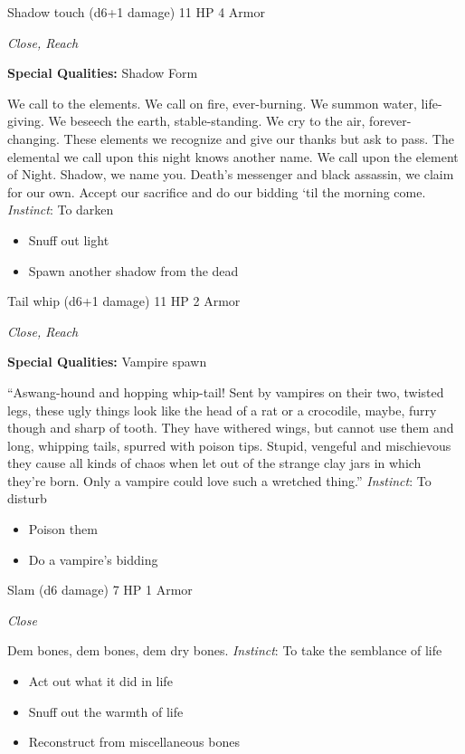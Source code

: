 \HRule
{}

Shadow touch (d6+1 damage)\hspace*{\fill} 11 HP 4 Armor

\emph{Close, Reach}

\textbf{Special Qualities:}
Shadow Form

\HRule
We call to the elements. We call on fire, ever-burning. We summon water, life-giving. We beseech the earth, stable-standing. We cry to the air, forever-changing. These elements we recognize and give our thanks but ask to pass. The elemental we call upon this night knows another name. We call upon the element of Night. Shadow, we name you. Death's messenger and black assassin, we claim for our own. Accept our sacrifice and do our bidding `til the morning come. \emph{Instinct}: To darken
\begin{itemize}
\item Snuff out light
\item Spawn another shadow from the dead
\end{itemize}
\newpage
\HRule
{}

Tail whip (d6+1 damage)\hspace*{\fill} 11 HP 2 Armor

\emph{Close, Reach}

\textbf{Special Qualities:}
Vampire spawn

\HRule
``Aswang-hound and hopping whip-tail! Sent by vampires on their two, twisted legs, these ugly things look like the head of a rat or a crocodile, maybe, furry though and sharp of tooth. They have withered wings, but cannot use them and long, whipping tails, spurred with poison tips. Stupid, vengeful and mischievous they cause all kinds of chaos when let out of the strange clay jars in which they're born. Only a vampire could love such a wretched thing.'' \emph{Instinct}: To disturb
\begin{itemize}
\item Poison them
\item Do a vampire's bidding
\end{itemize}

\HRule
{}

Slam (d6 damage)\hspace*{\fill} 7 HP 1 Armor

\emph{Close}

\HRule
Dem bones, dem bones, dem dry bones. \emph{Instinct}: To take the semblance of life
\begin{itemize}
\item Act out what it did in life
\item Snuff out the warmth of life
\item Reconstruct from miscellaneous bones
\end{itemize}
\newpage
\HRule
{}

